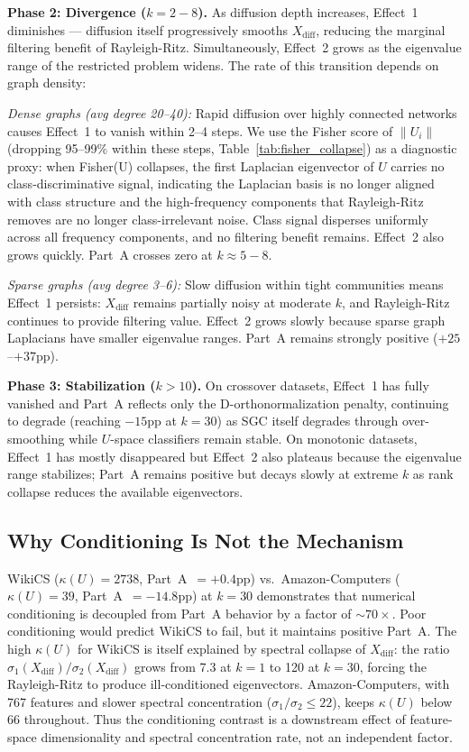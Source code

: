 \documentclass[11pt]{article}
\begin{document}
\textbf{Phase 2: Divergence ($k = 2{-}8$).}
As diffusion depth increases, Effect~1 diminishes — diffusion itself progressively
smooths $X_{\mathrm{diff}}$, reducing the marginal filtering benefit of Rayleigh-Ritz.
Simultaneously, Effect~2 grows as the eigenvalue range of the restricted problem widens.
The rate of this transition depends on graph density:

\emph{Dense graphs (avg degree 20--40):} Rapid diffusion over highly connected networks
causes Effect~1 to vanish within 2--4 steps.
We use the Fisher score of $\|U_i\|$ (dropping 95--99\% within these steps,
Table~\ref{tab:fisher_collapse}) as a diagnostic proxy: when Fisher(U) collapses,
the first Laplacian eigenvector of $U$ carries no class-discriminative signal,
indicating the Laplacian basis is no longer aligned with class structure and the
high-frequency components that Rayleigh-Ritz removes are no longer class-irrelevant noise.
Class signal disperses uniformly across all frequency components, and no filtering
benefit remains.  Effect~2 also grows quickly.  Part~A crosses zero at $k \approx 5{-}8$.

\emph{Sparse graphs (avg degree 3--6):} Slow diffusion within tight communities means
Effect~1 persists: $X_{\mathrm{diff}}$ remains partially noisy at moderate $k$, and
Rayleigh-Ritz continues to provide filtering value.  Effect~2 grows slowly because
sparse graph Laplacians have smaller eigenvalue ranges.  Part~A remains strongly
positive ($+25$--$+37$pp).

\textbf{Phase 3: Stabilization ($k > 10$).}
On crossover datasets, Effect~1 has fully vanished and Part~A reflects only the
D-orthonormalization penalty, continuing to degrade (reaching $-15$pp at $k{=}30$)
as SGC itself degrades through over-smoothing while $U$-space classifiers remain
stable.  On monotonic datasets, Effect~1 has mostly disappeared but Effect~2 also
plateaus because the eigenvalue range stabilizes; Part~A remains positive but
decays slowly at extreme $k$ as rank collapse reduces the available eigenvectors.

\subsection{Why Conditioning Is Not the Mechanism}

WikiCS ($\kappa(U) = 2738$, Part~A~$=+0.4$pp) vs.\ Amazon-Computers ($\kappa(U) = 39$,
Part~A~$=-14.8$pp) at $k{=}30$ demonstrates that numerical conditioning is decoupled
from Part~A behavior by a factor of $\sim70\times$.  Poor conditioning would predict
WikiCS to fail, but it maintains positive Part~A.
The high $\kappa(U)$ for WikiCS is itself explained by spectral collapse of
$X_{\mathrm{diff}}$: the ratio $\sigma_1(X_{\mathrm{diff}})/\sigma_2(X_{\mathrm{diff}})$
grows from 7.3 at $k{=}1$ to 120 at $k{=}30$, forcing the Rayleigh-Ritz to produce
ill-conditioned eigenvectors.  Amazon-Computers, with 767 features and slower spectral
concentration ($\sigma_1/\sigma_2 \leq 22$), keeps $\kappa(U)$ below 66 throughout.
Thus the conditioning contrast is a downstream effect of feature-space dimensionality
and spectral concentration rate, not an independent factor.
\end{document}
